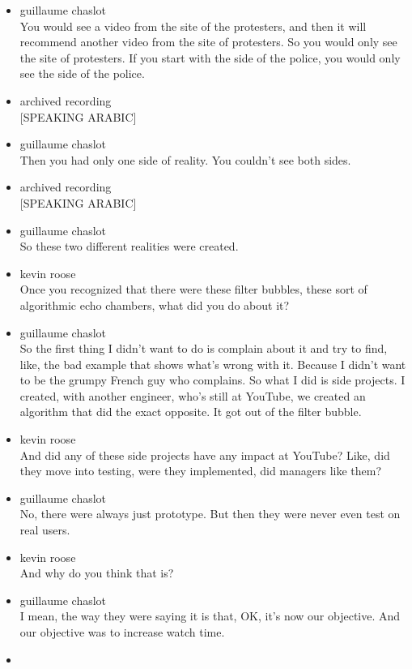 \begin{itemize}
\item
  guillaume chaslot\\
  You would see a video from the site of the protesters, and then it
  will recommend another video from the site of protesters. So you would
  only see the site of protesters. If you start with the side of the
  police, you would only see the side of the police.
\item
  archived recording\\
  {[}SPEAKING ARABIC{]}
\item
  guillaume chaslot\\
  Then you had only one side of reality. You couldn't see both sides.
\item
  archived recording\\
  {[}SPEAKING ARABIC{]}
\item
  guillaume chaslot\\
  So these two different realities were created.
\item
  kevin roose\\
  Once you recognized that there were these filter bubbles, these sort
  of algorithmic echo chambers, what did you do about it?
\item
  guillaume chaslot\\
  So the first thing I didn't want to do is complain about it and try to
  find, like, the bad example that shows what's wrong with it. Because I
  didn't want to be the grumpy French guy who complains. So what I did
  is side projects. I created, with another engineer, who's still at
  YouTube, we created an algorithm that did the exact opposite. It got
  out of the filter bubble.
\item
  kevin roose\\
  And did any of these side projects have any impact at YouTube? Like,
  did they move into testing, were they implemented, did managers like
  them?
\item
  guillaume chaslot\\
  No, there were always just prototype. But then they were never even
  test on real users.
\item
  kevin roose\\
  And why do you think that is?
\item
  guillaume chaslot\\
  I mean, the way they were saying it is that, OK, it's now our
  objective. And our objective was to increase watch time.
\item

\end{itemize}
